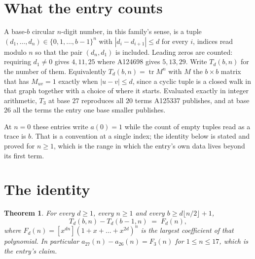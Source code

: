 \documentclass[11pt,a4paper]{article}
\theoremstyle{plain}
\newtheorem{theorem}{Theorem}
\theoremstyle{definition}
\begin{document}
\section{What the entry counts}

A base-$b$ circular $n$-digit number, in this family's sense, is a tuple
$(d_1,\dots,d_n)\in\{0,1,\dots,b-1\}^{n}$ with $|d_i-d_{i+1}|\le d$ for every $i$, indices
read modulo $n$ so that the pair $(d_n,d_1)$ is included. Leading zeros are counted: requiring
$d_1\ne0$ gives $4,11,25$ where A124698 gives $5,13,29$. Write $T_d(b,n)$ for the number of
them. Equivalently $T_d(b,n)=\operatorname{tr}M^{n}$ with $M$ the $b\times b$ matrix that has
$M_{uv}=1$ exactly when $|u-v|\le d$, since a cyclic tuple is a closed walk in that graph
together with a choice of where it starts. Evaluated exactly in integer arithmetic, $T_{3}$
at base $27$ reproduces all $20$ terms A125337 publishes, and at base $26$ all the
terms the entry one base smaller publishes.

At $n=0$ these entries write $a(0)=1$ while the count of empty tuples read as a trace is $b$.
That is a convention at a single index; the identity below is stated and proved for $n\ge1$,
which is the range in which the entry's own data lives beyond its first term.

\section{The identity}

\begin{theorem}
For every $d\ge1$, every $n\ge1$ and every $b\ge d\lfloor n/2\rfloor+1$,
\[
T_d(b,n)-T_d(b-1,n)\;=\;F_d(n),
\]
where $F_d(n)=[x^{dn}](1+x+\dots+x^{2d})^{n}$ is the largest coefficient of that
polynomial. In particular $a_{27}(n)-a_{26}(n)=F_{3}(n)$ for $1\le n\le17$, which
is the entry's claim.
\end{theorem}
\end{document}
